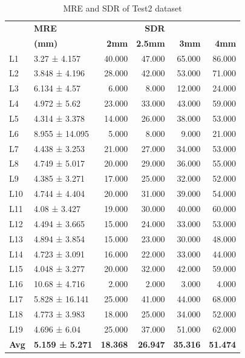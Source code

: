 \documentclass[sn-mathphys]{sn-jnl}%
\theoremstyle{thmstyleone}%
\theoremstyle{thmstyletwo}%
\theoremstyle{thmstylethree}%
\begin{document}
 \begin{table}[ht!]
 \centering
 \begin{tabular}{llrrrr}
\toprule
 &                \textbf{MRE}         &            &  \textbf{SDR} &\\
    &             \textbf{(mm)}&       \textbf{2mm} &       \textbf{2.5mm} &       \textbf{3mm}&       \textbf{4mm} \\
\midrule
   L1 &    3.27 ± 4.157 &  40.000 &  47.000 &  65.000 &  86.000 \\
  L2 &   3.848 ± 4.196 &  28.000 &  42.000 &  53.000 &  71.000 \\
  L3 &    6.134 ± 4.57 &   6.000 &   8.000 &  12.000 &  24.000 \\
  L4 &    4.972 ± 5.62 &  23.000 &  33.000 &  43.000 &  59.000 \\
  L5 &   4.314 ± 3.378 &  14.000 &  26.000 &  38.000 &  53.000 \\
  L6 &  8.955 ± 14.095 &   5.000 &   8.000 &   9.000 &  21.000 \\
  L7 &   4.438 ± 3.253 &  21.000 &  27.000 &  34.000 &  53.000 \\
  L8 &   4.749 ± 5.017 &  20.000 &  29.000 &  36.000 &  55.000 \\
  L9 &   4.385 ± 3.271 &  17.000 &  25.000 &  32.000 &  52.000 \\
 L10 &   4.744 ± 4.404 &  20.000 &  31.000 &  39.000 &  54.000 \\
 L11 &    4.08 ± 3.427 &  19.000 &  30.000 &  40.000 &  60.000 \\
 L12 &   4.494 ± 3.665 &  15.000 &  24.000 &  33.000 &  53.000 \\
 L13 &   4.894 ± 3.854 &  15.000 &  23.000 &  30.000 &  48.000 \\
 L14 &   4.723 ± 3.091 &  16.000 &  22.000 &  33.000 &  44.000 \\
 L15 &   4.048 ± 3.277 &  20.000 &  32.000 &  42.000 &  59.000 \\
 L16 &   10.68 ± 4.716 &   2.000 &   2.000 &   3.000 &   4.000 \\
 L17 &  5.828 ± 16.141 &  25.000 &  41.000 &  44.000 &  68.000 \\
 L18 &   4.773 ± 3.983 &  18.000 &  25.000 &  34.000 &  52.000 \\
 L19 &    4.696 ± 6.04 &  25.000 &  37.000 &  51.000 &  62.000 \\
 \textbf{Avg} &  \textbf{5.159 ± 5.271} &  \textbf{18.368} &  \textbf{26.947} &  \textbf{35.316} &  \textbf{51.474} \\
\bottomrule
\end{tabular}
\caption{MRE and SDR of Test2 dataset}
\label{table:6.2}
\end{table}
 
\end{document}

